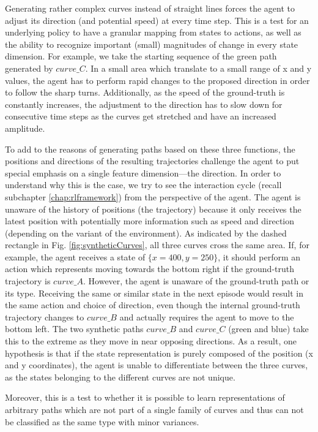 Generating rather complex curves instead of straight lines forces the agent to adjust its direction (and potential speed) at every time step. This is a test for an underlying policy to have a granular mapping from states to actions, as well as the ability to recognize important (small) magnitudes of change in every state dimension. For example, we take the starting sequence of the green path generated by $curve\_C$. In a small area which translate to a small range of x and y values, the agent has to perform rapid changes to the proposed direction in order to follow the sharp turns. 
\newpage
Additionally, as the speed of the ground-truth is constantly increases, the adjustment to the direction has to slow down for consecutive time steps as the curves get stretched and have an increased amplitude.
\par
To add to the reasons of generating paths based on these three functions, the positions and directions of the resulting trajectories challenge the agent to put special emphasis on a single feature dimension—the direction.  In order to understand why this is the case, we try to see the interaction cycle (recall subchapter \ref{chap:rlframework}) from the perspective of the agent. The agent is unaware of the history of positions (the trajectory) because it only receives the latest position with potentially more information such as speed and direction (depending on the variant of the environment). As indicated by the dashed rectangle in Fig. \ref{fig:syntheticCurves}, all three curves cross the same area. If, for example, the agent receives a state of $\{x=400, y=250\}$, it should perform an action which represents moving towards the bottom right if the ground-truth trajectory is $curve\_A$. However, the agent is unaware of the ground-truth path or its type. Receiving the same or similar state in the next episode would result in the same action and choice of direction, even though the internal ground-truth trajectory changes to $curve\_B$ and actually requires the agent to move to the bottom left. The two synthetic paths $curve\_B$ and $curve\_C$ (green and blue) take this to the extreme as they move in near opposing directions. As a result, one hypothesis is that if the state representation is purely composed of the position (x and y coordinates), the agent is unable to differentiate between the three curves, as the states belonging to the different curves are not unique.
\par
Moreover, this is a test to whether it is possible to learn representations of arbitrary paths which are not part of a single family of curves and thus can not be classified as the same type with minor variances.
